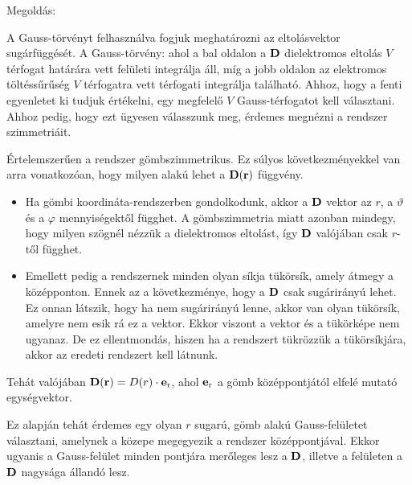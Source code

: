 
\ifdefined\megoldas
 
 Megoldás: 

 A Gauss-törvényt felhasználva fogjuk meghatározni az eltolásvektor sugárfüggését. A Gauss-törvény:
 ahol a bal oldalon a $\mathbf{D}$ dielektromos eltolás $V$ térfogat határára %
 vett felületi integrálja áll, míg a jobb oldalon az elektromos töltéssűrűség $V$ térfogatra vett térfogati integrálja található. Ahhoz, hogy a fenti egyenletet ki tudjuk értékelni, egy megfelelő $V$ Gauss-térfogatot kell választani. Ahhoz pedig, hogy ezt ügyesen válasszunk meg, érdemes megnézni a rendszer szimmetriáit. 

 Értelemszerűen a rendszer gömbszimmetrikus. Ez súlyos következményekkel van arra vonatkozóan, hogy milyen alakú lehet a $\mathbf{D}(\mathbf{r})$ függvény.
 \begin{itemize}
  \item Ha gömbi koordináta-rendszerben gondolkodunk, akkor a $\mathbf{D}$ vektor az $r$, a $\vartheta$ és a $\varphi$ mennyiségektől függhet. A gömbszimmetria miatt azonban mindegy, hogy milyen szögnél nézzük a dielektromos eltolást, így $\mathbf{D}$ valójában csak $r$-től függhet.
  \item Emellett pedig a rendszernek minden olyan síkja tükörsík, amely átmegy a középponton. Ennek az a következménye, hogy a $\mathbf{D}$ csak sugárirányú lehet. Ez onnan látszik, hogy ha nem sugárirányú lenne, akkor van olyan tükörsík, amelyre nem esik rá ez a vektor. Ekkor viszont a vektor és a tükörképe nem ugyanaz. De ez ellentmondás, hiszen ha a rendszert tükrözzük a tükörsíkjára, akkor az eredeti rendszert kell látnunk.
 \end{itemize}

 Tehát valójában $\mathbf{D}(\mathbf{r})=D(r)\cdot\mathbf{e}_\text{r}$, ahol $\mathbf{e}_\text{r}$ a gömb középpontjától elfelé mutató egységvektor. 

 Ez alapján tehát érdemes egy olyan $r$ sugarú, gömb alakú Gauss-felületet választani, amelynek a közepe megegyezik a rendszer középpontjával. Ekkor ugyanis a Gauss-felület minden pontjára merőleges lesz a $\mathbf{D}$, illetve a felületen a $\mathbf{D}$ nagysága állandó lesz. 


